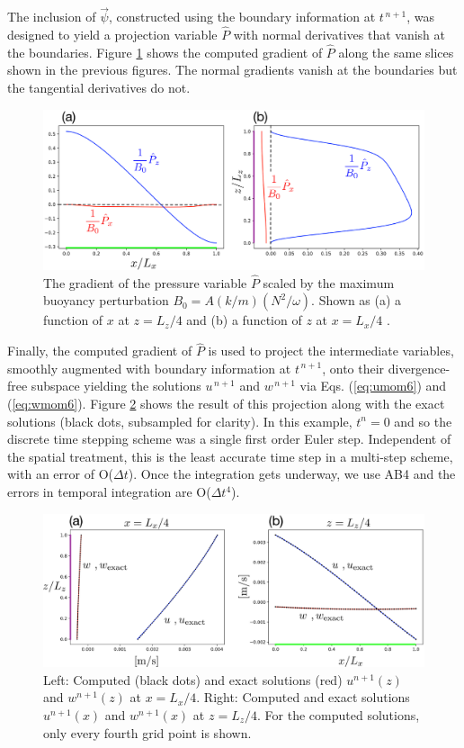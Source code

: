 \documentclass{jfm-like}
\begin{document}
The inclusion of $\vec \psi$, constructed using the boundary information at $t^{\,n+1}$, was designed to yield  a projection variable ${\hat P}$ with normal derivatives that vanish at the boundaries.
Figure \ref{fig:grad_P_hat} shows the computed gradient of ${\hat P}$ along the same slices shown in the previous figures. The normal gradients vanish at the boundaries but the tangential derivatives
do not.
 \begin{figure}
  \centerline{\includegraphics[width=1.0\textwidth]{FIGS/grad_P_hat.eps}}
  \caption{The gradient of the pressure variable ${\hat P}$ scaled by the maximum buoyancy perturbation $B_0 = A(k/m)(N^2/\omega)$.  Shown as (a) a function of $x$ at $z=L_z/4$ and (b) a function of $z$ at $x=L_x/4$ .
  }
  \label{fig:grad_P_hat}
\end{figure}


Finally, the computed gradient of ${\hat P}$ is used to project the intermediate variables, smoothly augmented with boundary information at $t^{\,n+1}$, onto their divergence-free subspace yielding the solutions
$u^{\,n+1}$ and $w^{\,n+1}$ via Eqs. (\ref{eq:umom6}) and (\ref{eq:wmom6}). Figure \ref{fig:exact_solns} shows the result of this projection along with the exact solutions (black dots, subsampled for clarity).
In this example, $t^n=0$ and so the discrete time stepping scheme was a single first order Euler step. Independent of the spatial treatment, this is the least accurate time step in a multi-step scheme, with an error of O($\Delta t$).
Once the integration gets underway, we use AB4 and the errors in temporal integration are O($\Delta t^4$).
 \begin{figure}
  \centerline{\includegraphics[width=1.0\textwidth]{FIGS/exact_solns.eps}}
  \caption{Left: Computed (black dots) and exact solutions (red)  $u^{n+1}(z)$ and $w^{n+1}(z)$ at $x=L_x/4$. Right: Computed and exact solutions  $u^{n+1}(x)$ and $w^{n+1}(x)$ at $z=L_z/4$. For the computed
  solutions, only every fourth grid point is shown.} 
  \label{fig:exact_solns}
\end{figure}
\end{document}
